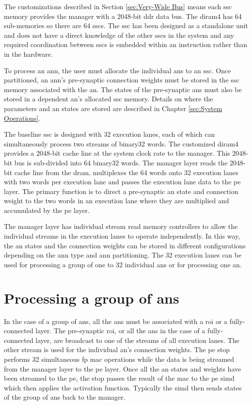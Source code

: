 The customizations described in Section \ref{sec:Very-Wide Bus} means each \ac{ssc} memory provides the manager with a 2048-bit \ac{ddr} data bus.
The \ac{diram4} has 64 sub-memories so there are 64 \acp{ssc}. 
The \ac{ssc} has been designed as a standalone unit and does not have a direct knowledge of the other \acp{ssc} in the system and any required coordination between \acp{ssc} is embedded within an instruction rather than in the hardware.

To process an \ac{ann}, the user must allocate the individual \acp{an} to an \ac{ssc}. 
Once partitioned, an \ac{ann}'s pre-synaptic connection weights must be stored in the \ac{ssc} memory associated with the \ac{an}.
The states of the pre-synaptic \acp{an} must also be stored in a dependent \ac{an}'s allocated \ac{ssc} memory.
Details on where the parameters and \ac{an} states are stored are described in Chapter \ref{sec:System Operations}.

The baseline \ac{ssc} is designed with 32 execution lanes, each of which can simultaneously process two streams of \ac{binary32} words.
The customized \ac{diram4} provides a 2048-bit cache line at the system clock rate to the manager. This 2048-bit bus is sub-divided into 64 \ac{binary32} words.
The manager layer reads the 2048-bit cache line from the \ac{dram}, multiplexes the 64 words onto 32 execution lanes with two words per execution lane and passes the execution lane data to the \ac{pe} layer.
The primary function is to direct a pre-synaptic \ac{an} state and connection weight to the two words in an execution lane where they are multiplied and accumulated by the \ac{pe} layer.

The manager layer has individual stream read memory controllers to allow the individual streams in the execution lanes to operate independently.
In this way, the \ac{an} states and the connection weights can be stored in different configurations depending on the \ac{ann} type and \ac{ann} partitioning.
The 32 execution lanes can be used for processing a group of one to 32 individual \acp{an} or for processing one \ac{an}.

\section{Processing a group of \acp{an}}
\label{sec:Processing a group of ANes}

In the case of a group of \acp{an}, all the \acp{an} must be associated with a \ac{roi} or a fully-connected layer.
The pre-synaptic \ac{roi}, or all the \acp{an} in the case of a fully-connected layer, are broadcast to one of the streams of all execution lanes.
The other stream is used for the individual \ac{an}'s connection weights. 
The \ac{pe} \ac{stop} performs 32 simultaneous \acf{fp} \ac{mac} operations while the data is being streamed from the manager layer to the \ac{pe} layer.
Once all the \ac{an} states and weights have been streamed to the \ac{pe}, the \ac{stop} passes the result of the \ac{mac} to the \ac{pe} \ac{simd} which then applies the activation function.
Typically the \ac{simd} then sends states of the group of \acp{an} back to the manager.

